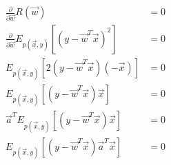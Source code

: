 \documentclass{introtosml}
\newcommand\Ep[1]{E_{p(\vec{x}, y)} \left[ #1 \right]}
\begin{document}
\maketitle

\begin{p}
  \item
    \begin{gather*}
      \begin{aligned}
        \frac{\partial}{\partial \vec{w}} R(\vec{w}) & = 0 \\
        \frac{\partial}{\partial \vec{w}} \Ep{(y - {\vec{w}}^T \vec{x})^2 } & = 0 \\
        \Ep{2 (y - {\vec{w}}^T \vec{x}) (-\vec{x})} & = 0 \\
        \Ep{(y - {\vec{w}}^T \vec{x}) \vec{x}} & = 0 \\
        \vec{a}^T \Ep{(y - {\vec{w}}^T \vec{x}) \vec{x}} & = 0 \\
        \Ep{(y - {\vec{w}}^T \vec{x}) \vec{a}^T \vec{x}} & = 0
      \end{aligned}
    \end{gather*}

  \item
    \begin{gather*}
    \end{gather*}
\end{p}
\end{document}
